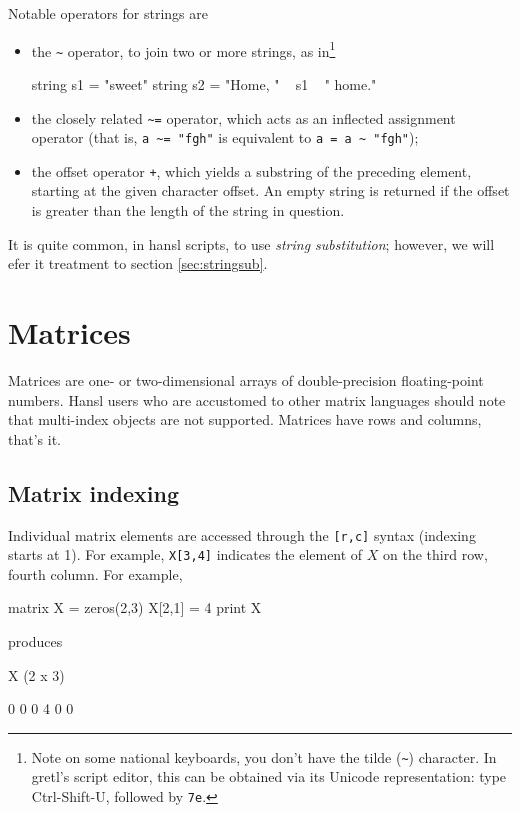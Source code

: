 Notable operators for strings are
\begin{itemize}
\item the \verb|~| operator, to join two or more strings, as
in\footnote{Note on some national keyboards, you don't have the tilde
  (\texttt{\~}) character. In gretl's script editor, this can be
  obtained via its Unicode representation: type Ctrl-Shift-U, followed
  by \texttt{7e}.}
  \begin{code}
    string s1 = "sweet"
    string s2 = "Home, " ~ s1 ~ " home."
  \end{code}
\item the closely related \verb|~=| operator, which acts as an
  inflected assignment operator (that is, \verb|a ~= "fgh"| is
  equivalent to \verb|a = a ~ "fgh"|);
\item the offset operator \texttt{+}, which yields a substring of the
  preceding element, starting at the given character offset.  An empty
  string is returned if the offset is greater than the length of the
  string in question.
\end{itemize}

It is quite common, in hansl scripts, to use \emph{string
  substitution}; however, we will efer it treatment to section
\ref{sec:stringsub}.

\chapter{Matrices}

Matrices are one- or two-dimensional arrays of double-precision
floating-point numbers. Hansl users who are accustomed to other matrix
languages should note that multi-index objects are not
supported. Matrices have rows and columns, that's it.

\section{Matrix indexing}
\label{sec:mat-index}

Individual matrix elements are accessed through the \verb|[r,c]|
syntax (indexing starts at 1). For example, \texttt{X[3,4]} indicates
the element of $X$ on the third row, fourth column. For example,
\begin{code}
  matrix X = zeros(2,3)
  X[2,1] = 4
  print X
\end{code}
produces
\begin{code}
X (2 x 3)

  0   0   0 
  4   0   0 
\end{code}

